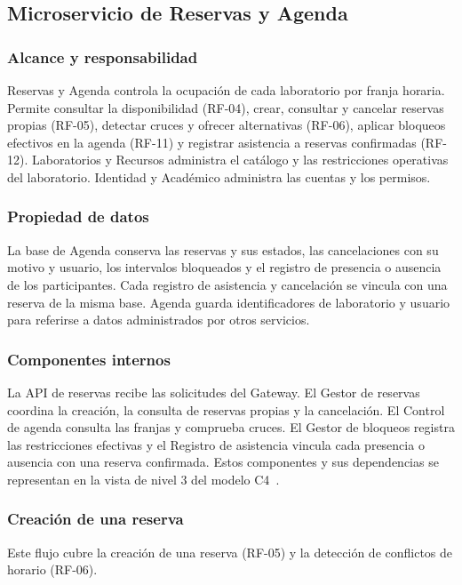 \subsection{Microservicio de Reservas y Agenda}

\subsubsection{Alcance y responsabilidad}
Reservas y Agenda controla la ocupación de cada laboratorio por franja
horaria. Permite consultar la disponibilidad (RF-04), crear, consultar y
cancelar reservas propias (RF-05), detectar cruces y ofrecer alternativas
(RF-06), aplicar bloqueos efectivos en la agenda (RF-11) y registrar
asistencia a reservas confirmadas (RF-12). Laboratorios y Recursos
administra el catálogo y las restricciones operativas del laboratorio.
Identidad y Académico administra las cuentas y los permisos.

\subsubsection{Propiedad de datos}
La base de Agenda conserva las reservas y sus estados, las cancelaciones
con su motivo y usuario, los intervalos bloqueados y el registro de presencia
o ausencia de los participantes. Cada registro de asistencia y cancelación
se vincula con una reserva de la misma base. Agenda guarda identificadores de
laboratorio y usuario para referirse a datos administrados por otros servicios.

\subsubsection{Componentes internos}
La API de reservas recibe las solicitudes del Gateway. El Gestor de reservas
coordina la creación, la consulta de reservas propias y la cancelación. El
Control de agenda consulta las franjas y comprueba cruces. El Gestor de
bloqueos registra las restricciones efectivas y el Registro de asistencia
vincula cada presencia o ausencia con una reserva confirmada. Estos
componentes y sus dependencias se representan en la vista de nivel 3 del
modelo C4~\cite{brownC4Componentes}.

\subsubsection{Creación de una reserva}
Este flujo cubre la creación de una reserva
(RF-05) y la detección de conflictos de horario (RF-06).


